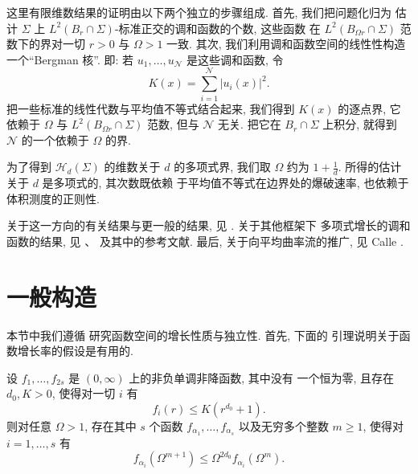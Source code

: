 这里有限维数结果的证明由以下两个独立的步骤组成. 首先, 我们把问题化归为
估计 $\Sigma$ 上 $L^2(B_r\cap\Sigma)$-标准正交的调和函数的个数, 这些函数
在 $L^2(B_{\Omega r}\cap\Sigma)$ 范数下的界对一切 $r>0$ 与
$\Omega>1$ 一致. 其次, 我们利用调和函数空间的线性性构造一个``Bergman 核''. 即: 若
$u_1,\dots,u_{\mathcal{N}}$ 是这些调和函数, 令
\begin{equation}
K(x)=\sum_{i=1}^{\mathcal{N}}|u_i(x)|^2.
\label{eq:3.61}
\end{equation}
把一些标准的线性代数与平均值不等式结合起来, 我们得到 $K(x)$ 的逐点界,
它依赖于 $\Omega$ 与 $L^2(B_{\Omega r}\cap\Sigma)$ 范数, 但与
$\mathcal{N}$ 无关. 把它在 $B_r\cap\Sigma$ 上积分, 就得到 $\mathcal{N}$
的一个依赖于 $\Omega$ 的界.

为了得到 $\mathcal{H}_d(\Sigma)$ 的维数关于 $d$ 的多项式界, 我们取
$\Omega$ 约为 $1+\frac1d$. 所得的估计关于 $d$ 是多项式的, 其次数既依赖
于平均值不等式在边界处的爆破速率, 也依赖于体积测度的正则性.

关于这一方向的有关结果与更一般的结果, 见 \cite{CM16}. 关于其他框架下
多项式增长的调和函数的结果, 见 \cite{CM14}、\cite{CM15} 及其中的参考文献.
最后, 关于向平均曲率流的推广, 见 Calle \cite{Ca}.

\section{一般构造}
\label{sec:3.4}

本节中我们遵循 \cite{CM16} 研究函数空间的增长性质与独立性. 首先, 下面的
引理说明关于函数增长率的假设是有用的.

\begin{lemma}
\label{lem:3.19}
设 $f_1,\dots,f_{2s}$ 是 $(0,\infty)$ 上的非负单调非降函数, 其中没有
一个恒为零, 且存在 $d_0,K>0$, 使得对一切 $i$ 有
\begin{equation}
f_i(r)\leq K(r^{d_0}+1).
\label{eq:3.62}
\end{equation}
则对任意 $\Omega>1$, 存在其中 $s$ 个函数
$f_{\alpha_1},\dots,f_{\alpha_s}$ 以及无穷多个整数 $m\geq1$, 使得对
$i=1,\dots,s$ 有
\begin{equation}
f_{\alpha_i}(\Omega^{m+1})\leq\Omega^{2d_0}f_{\alpha_i}(\Omega^m).
\label{eq:3.63}
\end{equation}
\end{lemma}

